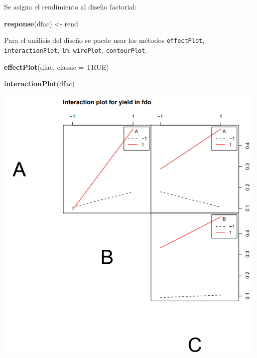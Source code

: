 \documentclass[
]{book}
\newenvironment{Shaded}{\begin{snugshade}}{\end{snugshade}}
\newcommand{\AttributeTok}[1]{\textcolor[rgb]{0.13,0.29,0.53}{#1}}
\newcommand{\ConstantTok}[1]{\textcolor[rgb]{0.56,0.35,0.01}{#1}}
\newcommand{\FunctionTok}[1]{\textcolor[rgb]{0.13,0.29,0.53}{\textbf{#1}}}
\newcommand{\NormalTok}[1]{#1}
\newcommand{\OtherTok}[1]{\textcolor[rgb]{0.56,0.35,0.01}{#1}}
\begin{document}
Se asigna el rendimiento al diseño factorial:

\begin{Shaded}
\begin{Highlighting}[]
\FunctionTok{response}\NormalTok{(dfac) }\OtherTok{\textless{}{-}}\NormalTok{ rend}
\end{Highlighting}
\end{Shaded}

Para el análisis del diseño se puede usar los métodos \texttt{effectPlot}, \texttt{interactionPlot}, \texttt{lm}, \texttt{wirePlot}, \texttt{contourPlot}.

\begin{Shaded}
\begin{Highlighting}[]
\FunctionTok{effectPlot}\NormalTok{(dfac, }\AttributeTok{classic =} \ConstantTok{TRUE}\NormalTok{)}
\end{Highlighting}
\end{Shaded}

\begin{Shaded}
\begin{Highlighting}[]
\FunctionTok{interactionPlot}\NormalTok{(dfac)}
\end{Highlighting}
\end{Shaded}

\includegraphics[width=5.20833in,height=\textheight]{graficos/interactionplot.png}
\end{document}
